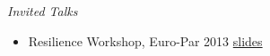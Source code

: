 {\sl Invited Talks}
\begin{itemize}
    \item Resilience Workshop, Euro-Par 2013 \href{slides/Resilience12.pdf}{slides}
\end{itemize}
